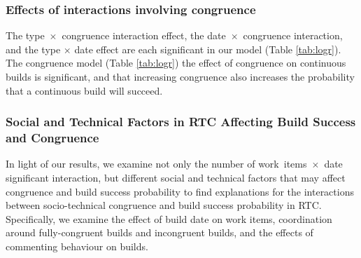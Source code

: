 \subsubsection{Effects of interactions involving congruence}
\label{sec:congruenceinteractions}
The type~$\times$~congruence interaction effect, the date~$\times$~congruence interaction, and the type $\times$ date effect are each significant in our model (Table \ref{tab:logr}). 
%
The congruence model (Table \ref{tab:logr}) the effect of congruence on continuous builds is significant, and that increasing congruence also increases the probability that a continuous build will succeed. 


%




\subsubsection{Social and Technical Factors in RTC Affecting Build Success and Congruence}
\label{sec:otherfactors}
In light of our results, we examine not only the number of work~items~$\times$~date significant interaction, but different social and technical factors that may affect congruence
and build success probability to find explanations for the interactions between socio-technical congruence and build success probability in RTC.
Specifically, we examine the effect of build date on work items, coordination around fully-congruent builds and
incongruent builds, and the effects of commenting behaviour on builds.


